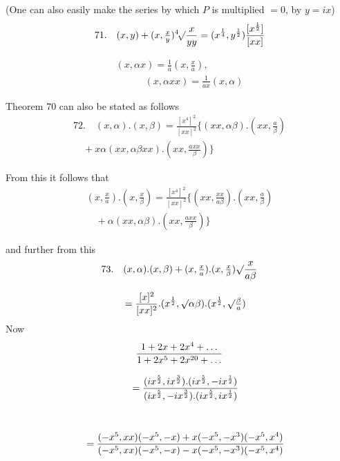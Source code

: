 (One can also easily make the series by which $P$ is multiplied $=0$,
by $y=ix$)
\[
71.\quad{}
(x,y)+(x,\tfrac xy)\mathord{{}^{4}\!\surd}{\frac x{yy}}
 =(x^{\frac14},y^{\frac12})\frac{[x^{\frac12}]}{[xx]}
\]

\[
\begin{gathered}(x,\alpha x)=\frac1a(x,\tfrac xa),
\\[8pt]\quad{}\qquad
(x,\alpha xx)=\frac1{ax}(x,\alpha)\end{gathered}
\]

Theorem 70 can also be stated as follows
\[
\begin{gathered}72.\quad{}
(x,\alpha).(x,\beta)=\frac{[x^4]^2}{[xx]^2}
 \{(xx,\alpha\beta).(xx,\tfrac a\beta)
 \\[8pt]\quad{}+x\alpha(xx,\alpha\beta xx).(xx,\tfrac{axx}\beta)\}\end{gathered}
\]

From this it follows that
\[
\begin{gathered}(x,\tfrac xa).(x,\tfrac x\beta)=\frac{[x^4]^2}{[xx]^2}
 \{(xx,\tfrac{xx}{a\beta}).(xx,\tfrac a\beta)
 \\[8pt]\quad{}+\alpha(xx,\alpha\beta).(xx,\tfrac{axx}\beta)\}\end{gathered}
\]

and further from this
\[
\begin{gathered}73.\quad{}
(x,\alpha).(x,\beta)+(x,\tfrac xa).(x,\tfrac x\beta)\mathord{\surd}{\frac x{a\beta}}
 \\[8pt]\quad{}=\frac{[x]^2}{[xx]^2}.(x^{\frac12},\mathord{\surd}{\alpha\beta}).(x^{\frac12},\mathord{\surd}{\tfrac\beta a})\end{gathered}
\]
Now
\[
\begin{gathered}
\frac{1+2x+2x^4+\mathinner{.\,.\,.}}{1+2x^5+2x^{20}+\mathinner{.\,.\,.}}
\\[8pt]\quad{}=\frac{(ix^{\frac52},ix^{\frac32}).(ix^{\frac52},-ix^{\frac12})}
 {(ix^{\frac52},-ix^{\frac32}).(ix^{\frac52},ix^{\frac12})}\\[1ex]
\\[8pt]\quad{}=\frac{(-x^5,xx)(-x^5,-x)+x(-x^5,-x^3)(-x^5,x^4)}
 {(-x^5,xx)(-x^5,-x)-x(-x^5,-x^3)(-x^5,x^4)}
\end{gathered}
\]

